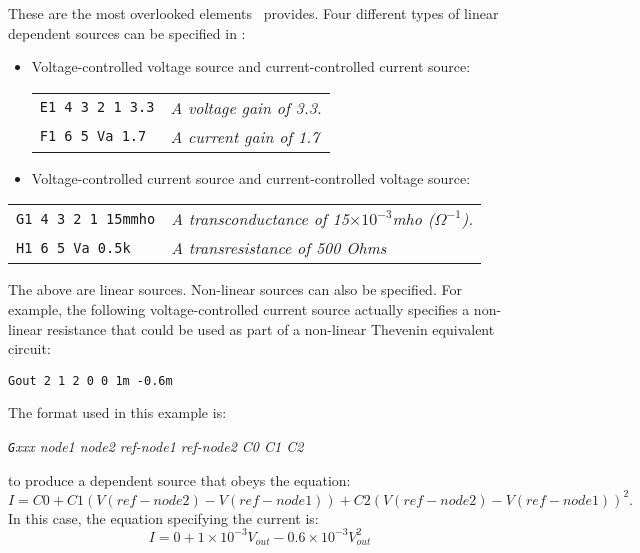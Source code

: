 These are the most overlooked elements \spice\ provides.
Four different types of linear dependent sources can be
specified in \spice:
\begin{itemize}
\item Voltage-controlled voltage source and current-controlled current
source:
\par\noindent
\centerline{}
\par\noindent
\begin{center}
\begin{tabular}{ll}
{\tt E1 4 3 2 1 3.3}  & {\em A voltage gain of 3.3.} \\
{\tt F1 6 5 Va 1.7} & {\em A current gain of 1.7}
\end{tabular}
\end{center}
\item Voltage-controlled current source and current-controlled voltage
source:
\end{itemize}
\par\noindent
\centerline{}
\par\noindent
\begin{center}
\begin{tabular}{ll}
{\tt G1 4 3 2 1 15mmho}  & {\em A transconductance of 15$\times 10^{-3}$mho
($\Omega^{-1}$).} \\
{\tt H1 6 5 Va 0.5k} & {\em A transresistance of 500 Ohms}
\end{tabular}
\end{center}
The above are linear sources.  Non-linear sources can also be specified.
For example, the following voltage-controlled current source
actually specifies a non-linear resistance that could be used as
part of a non-linear Thevenin equivalent circuit:
\par\noindent
\centerline{}
\par\noindent
\begin{center}
{\tt Gout 2 1 2 0   0 1m -0.6m}
\end{center}
The format used in this example is:
\begin{center}
  {\it {\tt G}xxx node1 node2 ref-node1 ref-node2 C0 C1 C2}
\end{center}
to produce a dependent source that obeys the equation:
\[
I = C0 + C1 (V(ref-node2) - V(ref-node1)) + C2 (V(ref-node2) - V(ref-node1))^2.
\]
In this case, the equation specifying the current is:
\[
 I = 0 + 1 \times 10^{-3} V_{out} - 0.6\times 10^{-3} V_{out}^2
\]
\par\noindent
